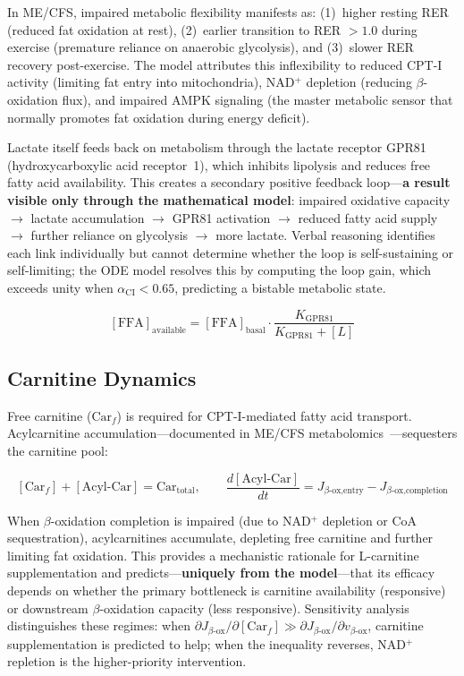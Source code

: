 In ME/CFS, impaired metabolic flexibility manifests as: (1)~higher resting RER (reduced fat oxidation at rest), (2)~earlier transition to RER $> 1.0$ during exercise (premature reliance on anaerobic glycolysis), and (3)~slower RER recovery post-exercise. The model attributes this inflexibility to reduced CPT-I activity (limiting fat entry into mitochondria), NAD$^+$ depletion (reducing $\beta$-oxidation flux), and impaired AMPK signaling (the master metabolic sensor that normally promotes fat oxidation during energy deficit).

Lactate itself feeds back on metabolism through the lactate receptor GPR81 (hydroxycarboxylic acid receptor~1), which inhibits lipolysis and reduces free fatty acid availability. This creates a secondary positive feedback loop---\textbf{a result visible only through the mathematical model}: impaired oxidative capacity $\to$ lactate accumulation $\to$ GPR81 activation $\to$ reduced fatty acid supply $\to$ further reliance on glycolysis $\to$ more lactate. Verbal reasoning identifies each link individually but cannot determine whether the loop is self-sustaining or self-limiting; the ODE model resolves this by computing the loop gain, which exceeds unity when $\alpha_{\text{CI}} < 0.65$, predicting a bistable metabolic state.

\begin{equation}
\label{eq:gpr81-feedback}
[\text{FFA}]_{\text{available}} = [\text{FFA}]_{\text{basal}} \cdot \frac{K_{\text{GPR81}}}{K_{\text{GPR81}} + [L]}
\end{equation}

\subsection{Carnitine Dynamics}

Free carnitine ($\text{Car}_f$) is required for CPT-I-mediated fatty acid transport. Acylcarnitine accumulation---documented in ME/CFS metabolomics~\cite{Germain2020metabolic}---sequesters the carnitine pool:

\begin{equation}
\label{eq:carnitine-balance}
[\text{Car}_f] + [\text{Acyl-Car}] = \text{Car}_{\text{total}}, \qquad \frac{d[\text{Acyl-Car}]}{dt} = J_{\beta\text{-ox,entry}} - J_{\beta\text{-ox,completion}}
\end{equation}

When $\beta$-oxidation completion is impaired (due to NAD$^+$ depletion or CoA sequestration), acylcarnitines accumulate, depleting free carnitine and further limiting fat oxidation. This provides a mechanistic rationale for L-carnitine supplementation and predicts---\textbf{uniquely from the model}---that its efficacy depends on whether the primary bottleneck is carnitine availability (responsive) or downstream $\beta$-oxidation capacity (less responsive). Sensitivity analysis distinguishes these regimes: when $\partial J_{\beta\text{-ox}} / \partial [\text{Car}_f] \gg \partial J_{\beta\text{-ox}} / \partial v_{\beta\text{-ox}}$, carnitine supplementation is predicted to help; when the inequality reverses, NAD$^+$ repletion is the higher-priority intervention.


